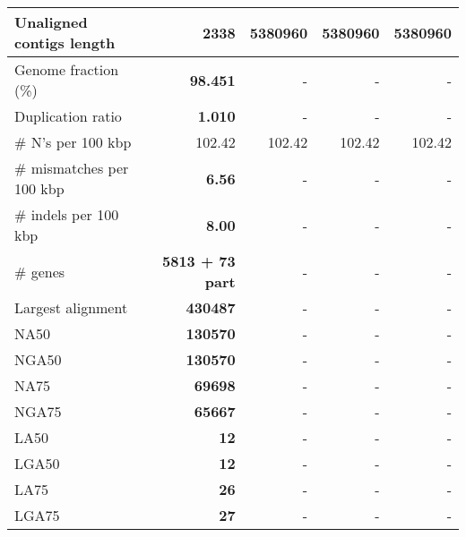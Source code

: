 \documentclass[12pt,a4paper]{article}
\begin{document}
\begin{table}[ht]
\begin{center}
\begin{tabular}{|l*{4}{|r}|}
Unaligned contigs length & {\bf 2338} & 5380960 & 5380960 & 5380960 \\ \hline
Genome fraction (\%) & {\bf 98.451} & - & - & - \\ \hline
Duplication ratio & {\bf 1.010} & - & - & - \\ \hline
\# N's per 100 kbp & 102.42 & 102.42 & 102.42 & 102.42 \\ \hline
\# mismatches per 100 kbp & {\bf 6.56} & - & - & - \\ \hline
\# indels per 100 kbp & {\bf 8.00} & - & - & - \\ \hline
\# genes & {\bf 5813 + 73 part} & - & - & - \\ \hline
Largest alignment & {\bf 430487} & - & - & - \\ \hline
NA50 & {\bf 130570} & - & - & - \\ \hline
NGA50 & {\bf 130570} & - & - & - \\ \hline
NA75 & {\bf 69698} & - & - & - \\ \hline
NGA75 & {\bf 65667} & - & - & - \\ \hline
LA50 & {\bf 12} & - & - & - \\ \hline
LGA50 & {\bf 12} & - & - & - \\ \hline
LA75 & {\bf 26} & - & - & - \\ \hline
LGA75 & {\bf 27} & - & - & - \\ \hline
\end{tabular}
\end{center}
\end{table}
\end{document}
